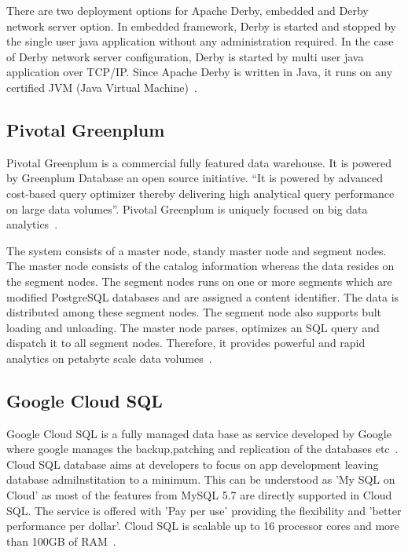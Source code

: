 There are two deployment options for Apache Derby, embedded and Derby
network server option. In embedded framework, Derby is started and
stopped by the single user java application without any administration
required. In the case of Derby network server configuration, Derby is
started by multi user java application over TCP/IP. Since Apache Derby
is written in Java, it runs on any certified JVM (Java Virtual
Machine)~\cite{www-derbymanual}.

     \pv
      
\subsection{Pivotal Greenplum}

Pivotal Greenplum is a commercial fully featured data warehouse. It is
powered by Greenplum Database an open source initiative. ``It is
powered by advanced cost-based query optimizer thereby delivering high
analytical query performance on large data volumes''. Pivotal
Greenplum is uniquely focused on big data analytics~\cite{pivotal.io}.

The system consists of a master node, standy master node and segment
nodes. The master node consists of the catalog information whereas the
data resides on the segment nodes.  The segment nodes runs on one or
more segments which are modified PostgreSQL databases and are assigned
a content identifier. The data is distributed among these segment
nodes. The segment node also supports bult loading and unloading. The
master node parses, optimizes an SQL query and dispatch it to all
segment nodes. Therefore, it provides powerful and rapid analytics on
petabyte scale data volumes~\cite{pivotal_wikipedia}.
     
\subsection{Google Cloud SQL}
     
Google Cloud SQL is a fully managed data base as service developed by
Google where google manages the backup,patching and replication of the
databases etc~\cite{www-cloud-sql-google}. Cloud SQL database aims at
developers to focus on app development leaving database
admilnstitation to a minimum. This can be understood as 'My SQL on
Cloud' as most of the features from MySQL 5.7 are directly supported
in Cloud SQL. The service is offered with 'Pay per use' providing the
flexibility and 'better performance per dollar'.  Cloud SQL is
scalable up to 16 processor cores and more than 100GB of
RAM~\cite{www-cloud-sql-google-faq}.

